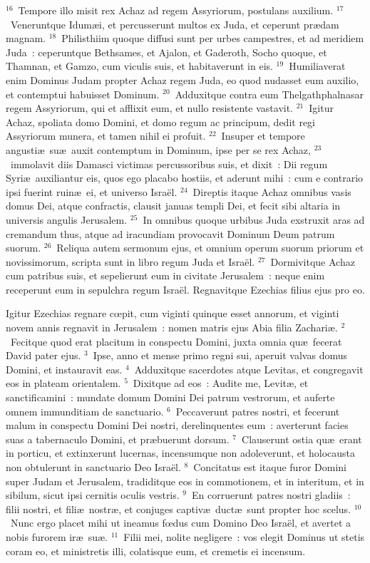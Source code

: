${}^{16}$~Tempore illo misit rex Achaz ad regem Assyriorum, postulans auxilium.
${}^{17}$~Veneruntque Idum\ae i, et percusserunt multos ex Juda, et ceperunt pr\ae dam magnam.
${}^{18}$~Philisthiim quoque diffusi sunt per urbes campestres, et ad meridiem Juda~: ceperuntque Bethsames, et Ajalon, et Gaderoth, Socho quoque, et Thamnan, et Gamzo, cum viculis suis, et habitaverunt in eis.
${}^{19}$~Humiliaverat enim Dominus Judam propter Achaz regem Juda, eo quod nudasset eum auxilio, et contemptui habuisset Dominum.
${}^{20}$~Adduxitque contra eum Thelgathphalnasar regem Assyriorum, qui et afflixit eum, et nullo resistente vastavit.
${}^{21}$~Igitur Achaz, spoliata domo Domini, et domo regum ac principum, dedit regi Assyriorum munera, et tamen nihil ei profuit.
${}^{22}$~Insuper et tempore angusti\ae\ su\ae\ auxit contemptum in Dominum, ipse per se rex Achaz,
${}^{23}$~immolavit diis Damasci victimas percussoribus suis, et dixit~: Dii regum Syri\ae\ auxiliantur eis, quos ego placabo hostiis, et aderunt mihi~: cum e contrario ipsi fuerint ruin\ae\ ei, et universo Isra\"el.
${}^{24}$~Direptis itaque Achaz omnibus vasis domus Dei, atque confractis, clausit januas templi Dei, et fecit sibi altaria in universis angulis Jerusalem.
${}^{25}$~In omnibus quoque urbibus Juda exstruxit aras ad cremandum thus, atque ad iracundiam provocavit Dominum Deum patrum suorum.
${}^{26}$~Reliqua autem sermonum ejus, et omnium operum suorum priorum et novissimorum, scripta sunt in libro regum Juda et Isra\"el.
${}^{27}$~Dormivitque Achaz cum patribus suis, et sepelierunt eum in civitate Jerusalem~: neque enim receperunt eum in sepulchra regum Isra\"el. Regnavitque Ezechias filius ejus pro eo.

\lettrine[lines=10,image=true,loversize=0.05,lraise=-0.03]{I}{}gitur Ezechias regnare cœpit, cum viginti quinque esset annorum, et viginti novem annis regnavit in Jerusalem~: nomen matris ejus Abia filia Zachari\ae .
${}^{2}$~Fecitque quod erat placitum in conspectu Domini, juxta omnia qu\ae\ fecerat David pater ejus.
${}^{3}$~Ipse, anno et mense primo regni sui, aperuit valvas domus Domini, et instauravit eas.
${}^{4}$~Adduxitque sacerdotes atque Levitas, et congregavit eos in plateam orientalem.
${}^{5}$~Dixitque ad eos~: Audite me, Levit\ae , et sanctificamini~: mundate domum Domini Dei patrum vestrorum, et auferte omnem immunditiam de sanctuario.
${}^{6}$~Peccaverunt patres nostri, et fecerunt malum in conspectu Domini Dei nostri, derelinquentes eum~: averterunt facies suas a tabernaculo Domini, et pr\ae buerunt dorsum.
${}^{7}$~Clauserunt ostia qu\ae\ erant in porticu, et extinxerunt lucernas, incensumque non adoleverunt, et holocausta non obtulerunt in sanctuario Deo Isra\"el.
${}^{8}$~Concitatus est itaque furor Domini super Judam et Jerusalem, tradiditque eos in commotionem, et in interitum, et in sibilum, sicut ipsi cernitis oculis vestris.
${}^{9}$~En corruerunt patres nostri gladiis~: filii nostri, et fili\ae\ nostr\ae , et conjuges captiv\ae\ duct\ae\ sunt propter hoc scelus.
${}^{10}$~Nunc ergo placet mihi ut ineamus fœdus cum Domino Deo Isra\"el, et avertet a nobis furorem ir\ae\ su\ae .
${}^{11}$~Filii mei, nolite negligere~: vos elegit Dominus ut stetis coram eo, et ministretis illi, colatisque eum, et cremetis ei incensum.


